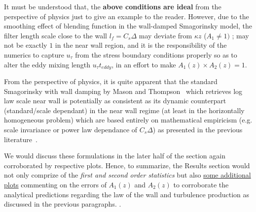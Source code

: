 {It must be understood that, the \textbf{above conditions are ideal} from the perspective of physics just to give an example to the reader}. However, due to the smoothing effect of blending function in the wall-damped Smagorinsky model, the filter length scale close to the wall  $l_f = C_s\Delta$ may deviate from $\kappa z$ ($A_1 \neq 1)$ ; {may not be exactly $1$ in the near wall region, and it is the responsibility of the numerics to capture $u_{\tau}$ from the stress boundary conditions properly so as to alter the eddy mixing length $u_{\tau} t_{eddy}$, in an effort to make $A_1(z) \times A_2(z) = 1 $}.  

{From the perspective of physics, it is quite apparent that the standard Smagorinsky with wall damping by Mason and Thompson~\cite{mason} which retrieves log law scale near wall is potentially as consistent as its dynamic counterpart (standard/scale dependant) in the near wall regime (at least in the horizontally homogeneous problem) which are based entirely on mathematical empiricism (e.g. scale invariance or power law dependance of $C_s\Delta$) as presented in the previous literature~\cite{germano,porte1fun,bou1}.}  

{We would discuss these formulations in the later half of the section again corroborated by respective plots.
Hence, to summarize, the Results section would not only comprize of the \textit{first and second order statistics} but also \underline{some additional plots} commenting on the errors of $A_1(z)$ and $A_2(z)$ to corroborate the analytical predictions regarding the law of the wall and turbulence production as discussed in the previous paragraphs.}  .
